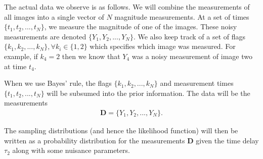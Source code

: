 \documentclass[useAMS,usenatbib, a4paper]{mn2e} \usepackage{natbib}
\newcommand{\data}{\boldsymbol{D}}
\begin{document}
The actual data we observe is as follows. We will combine the measurements of all
images into a single vector of $N$ magnitude measurements.
At a set of times
$\{t_1, t_2, ..., t_N\}$, we measure the magnitude of one of the images. These
noisy measurements are denoted $\{Y_1, Y_2, ..., Y_N\}$. We also keep track of
a set of flags $\{k_1, k_2, ..., k_N\}, \forall k_i \in \{1, 2\}$ which specifies
which image was measured. For example, if $k_4 = 2$ then we know that $Y_4$ was
a noisy measurement of image two at time $t_4$.

When we use Bayes' rule, the flags $\{k_1, k_2, ..., k_N\}$ and measurement
times $\{t_1, t_2, ..., t_N\}$ will be subsumed into the prior information. The
data will be the measurements
\begin{eqnarray}
\boldsymbol{D} = \{Y_1, Y_2, ..., Y_N\}.
\end{eqnarray}

The sampling distributions (and hence the likelihood function) will then be
written as a probability distribution for the measurements $\data$
given the time delay $\tau_2$ along with some nuisance parameters.
\end{document}
